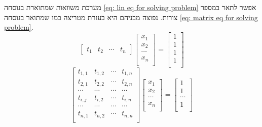 \documentclass[12pt,leqno]{article}
\begin{document}
מערכת משוואות 
שמתוארת בנוסחה
\ref{eq: lin eq for solving problem}
אפשר לתאר במספר צורות.
נפוצה מבניהם היא
בעזרת מטריצה כמו שמתואר 
בנוסחה 
\ref{eq: matrix eq for solving problem}.
\begin{equation*}
    \begin{bmatrix}
        t_1 & t_2 & \cdots & t_n
    \end{bmatrix}
    \begin{bmatrix}
        x_1 \\
        x_2 \\
        \cdots \\
        x_n \\
    \end{bmatrix}
    =
    \begin{bmatrix}
        1 \\
        1 \\
        1 \\
        1 \\
    \end{bmatrix}
\end{equation*}
\begin{equation}
    \label{eq: matrix eq for solving problem}
    \begin{bmatrix}
        t_{1,1} & t_{1,2} & \cdots & t_{1,n} \\
        t_{2,1} & t_{2,2} & \cdots & t_{2,n} \\
        \cdots & \cdots & \cdots & \cdots\\
        t_{i,j} & t_{i,2} & \cdots & t_{i,n} \\
        \cdots & \cdots & \cdots & \cdots\\
        t_{n,1} & t_{n,2} & \cdots & t_{n,n} \\
    \end{bmatrix}
    \begin{bmatrix}
        x_1 \\
        x_2 \\
        \cdots \\
        x_n \\
    \end{bmatrix}
    = 
    \begin{bmatrix}
        1 \\
        1 \\
        \cdots \\
        1 \\
    \end{bmatrix}
\end{equation}
\end{document}
